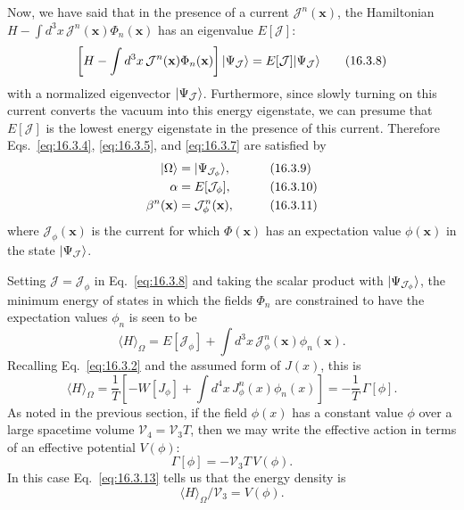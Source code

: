 Now, we have said that in the presence of a current $\mathcal J^n(\mathbf{x})$, the Hamiltonian $H-\int d^3x\,\mathcal J^n(\mathbf{x})\Phi_n(\mathbf{x})$ has an eigenvalue $E[\mathcal J]$:
\begin{equation}
\left[H-\int d^3x\,\mathcal J^n(\mathbf{x})\Phi_n(\mathbf{x})\right]
\lvert \Psi_{\mathcal J}\rangle
=E[\mathcal J]\lvert \Psi_{\mathcal J}\rangle
\tag{16.3.8}\label{eq:16.3.8}
\end{equation}
with a normalized eigenvector $\lvert \Psi_{\mathcal J}\rangle$. Furthermore, since slowly turning on this current converts the vacuum into this energy eigenstate, we can presume that $E[\mathcal J]$ is the lowest energy eigenstate in the presence of this current. Therefore Eqs.~\eqref{eq:16.3.4}, \eqref{eq:16.3.5}, and \eqref{eq:16.3.7} are satisfied by
\begin{align}
\lvert \Omega\rangle&=\lvert \Psi_{\mathcal J_\phi}\rangle,
&&\tag{16.3.9}\label{eq:16.3.9}\\
\alpha&=E[\mathcal J_\phi],
&&\tag{16.3.10}\label{eq:16.3.10}\\
\beta^n(\mathbf{x})&=\mathcal J_\phi^n(\mathbf{x}),
&&\tag{16.3.11}\label{eq:16.3.11}
\end{align}
where $\mathcal J_\phi(\mathbf{x})$ is the current for which $\Phi(\mathbf{x})$ has an expectation value $\phi(\mathbf{x})$ in the state $\lvert \Psi_{\mathcal J}\rangle$.

Setting $\mathcal J=\mathcal J_\phi$ in Eq.~\eqref{eq:16.3.8} and taking the scalar product with $\lvert \Psi_{\mathcal J_\phi}\rangle$, the minimum energy of states in which the fields $\Phi_n$ are constrained to have the expectation values $\phi_n$ is seen to be
\begin{equation}
\langle H\rangle_\Omega
=E[\mathcal J_\phi]
+\int d^3x\,\mathcal J_\phi^n(\mathbf{x})\phi_n(\mathbf{x}).
\tag{16.3.12}\label{eq:16.3.12}
\end{equation}
Recalling Eq.~\eqref{eq:16.3.2} and the assumed form of $J(x)$, this is
\begin{equation}
\langle H\rangle_\Omega
=\frac{1}{T}\left[-W[J_\phi]
+\int d^4x\,J_\phi^n(x)\phi_n(x)\right]
=-\frac{1}{T}\,\Gamma[\phi].
\tag{16.3.13}\label{eq:16.3.13}
\end{equation}
As noted in the previous section, if the field $\phi(x)$ has a constant value $\phi$ over a large spacetime volume $\mathcal V_4=\mathcal V_3T$, then we may write the effective action in terms of an effective potential $V(\phi)$:
\begin{equation}
\Gamma[\phi]=-\mathcal V_3T\,V(\phi).
\tag{16.3.14}\label{eq:16.3.14}
\end{equation}
In this case Eq.~\eqref{eq:16.3.13} tells us that the energy density is
\begin{equation}
\langle H\rangle_\Omega/\mathcal V_3=V(\phi).
\tag{16.3.15}\label{eq:16.3.15}
\end{equation}

